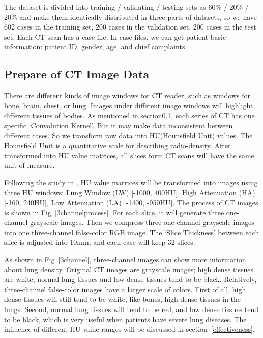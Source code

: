 \documentclass[journal]{IEEEtran}
\begin{document}
The dataset is divided into training / validating / testing sets as 60\% / 20\% / 20\% and make them identically distributed in three parts of datasets, so we have 602 cases in the training set, 200 cases in the validation set, 200 cases in the test set.
Each CT scan has a case file. In case files, we can get patient basic information: patient ID, gender, age, and chief complaints. 

\subsection{Prepare of CT Image Data}
\label{ctimagedata}
There are different kinds of image windows for CT reader, such as windows for bone, brain, chest, or lung. Images under different image windows will highlight different tissues of bodies.
As mentioned in section\ref{ctimagedata}, each series of CT has one specific `Convolution Kernel'. But it may make data inconsistent between different cases. So we transform raw data into HU(Hounsfield Unit) values. The Hounsfield Unit is a quantitative scale for describing radio-density. After transformed into HU value matrices, all slices form CT scans will have the same unit of measure.

Following the study in \cite{Shin2017Three, gao2018holistic}, HU value matrices will be transformed into images using three HU windows: Lung Window (LW) [-1000, 400HU], High Attenuation (HA) [-160, 240HU], Low Attenuation (LA) [-1400, -950HU]. The process of CT images is shown in Fig~\ref{3channelprocess}.
For each slice, it will generate three one-channel grayscale images. Then we compress three one-channel grayscale images into one three-channel false-color RGB image. The `Slice Thickness' between each slice is adjusted into 10mm, and each case will keep 32 slices.

As shown in Fig~\ref{3channel}, three-channel images can show more information about lung density. Original CT images are grayscale images; high dense tissues are white; normal lung tissues and low dense tissues tend to be black. 
Relatively, three-channel false-color images have a larger scale of colors. First of all, high dense tissues will still tend to be white, like bones, high dense tissues in the lungs. Second, normal lung tissues will tend to be red, and low dense tissues tend to be black, which is very useful when patients have severe lung diseases.
The influence of different HU value ranges will be discussed in section~\ref{effectiveness}.
    
\end{document}
